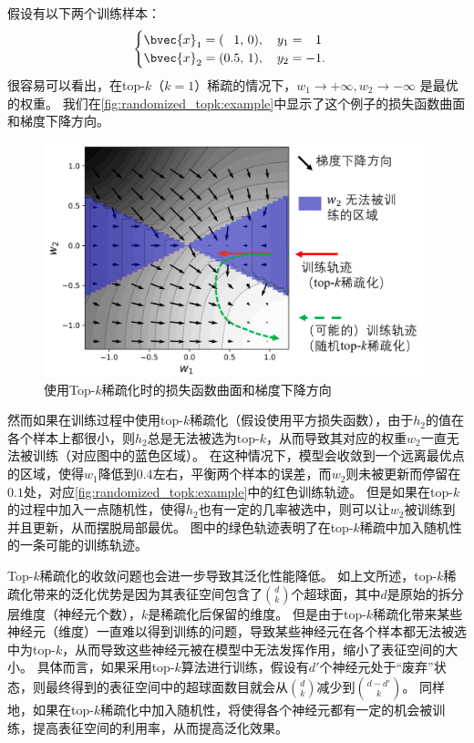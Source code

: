 假设有以下两个训练样本：
\begin{equation}
\begin{cases}
    \bvec{x}_1 = (\phantom{0.}1, \, 0), \quad y_1 = \phantom{-}1 \\
    \bvec{x}_2 = (          0.5, \, 1), \quad y_2 = -1.
\end{cases}
\end{equation}
%
很容易可以看出，在top-$k$（$k=1$）稀疏的情况下，$w_1 \to +\infty, w_2 \to -\infty$ 是最优的权重。
%
我们在\autoref{fig:randomized_topk:example}中显示了这个例子的损失函数曲面和梯度下降方向。


\begin{figure}[htbp]
    \centering
    \includegraphics[width=0.75\linewidth]{Z_Resources/随机topk_例子.png}
    \caption{使用Top-$k$稀疏化时的损失函数曲面和梯度下降方向}
    \label{fig:randomized_topk:example}
\end{figure}



然而如果在训练过程中使用top-$k$稀疏化（假设使用平方损失函数），由于$h_2$的值在各个样本上都很小，则$h_2$总是无法被选为top-$k$，从而导致其对应的权重$w_2$一直无法被训练（对应图中的蓝色区域）。
%
在这种情况下，模型会收敛到一个远离最优点的区域，使得$w_1$降低到$0.4$左右，平衡两个样本的误差，而$w_2$则未被更新而停留在$0.1$处，对应\autoref{fig:randomized_topk:example}中的红色训练轨迹。
%
但是如果在top-$k$的过程中加入一点随机性，使得$h_2$也有一定的几率被选中，则可以让$w_2$被训练到并且更新，从而摆脱局部最优。
图中的绿色轨迹表明了在top-$k$稀疏中加入随机性的一条可能的训练轨迹。


Top-$k$稀疏化的收敛问题也会进一步导致其泛化性能降低。
%
如上文所述，top-$k$稀疏化带来的泛化优势是因为其表征空间包含了$d \choose k$个超球面，其中$d$是原始的拆分层维度（神经元个数），$k$是稀疏化后保留的维度。
%
但是由于top-$k$稀疏化带来某些神经元（维度）一直难以得到训练的问题，导致某些神经元在各个样本都无法被选中为top-$k$，从而导致这些神经元被在模型中无法发挥作用，缩小了表征空间的大小。
%
具体而言，如果采用top-$k$算法进行训练，假设有$d'$个神经元处于“废弃”状态，则最终得到的表征空间中的超球面数目就会从$d \choose k$减少到$d - d' \choose k$。
%
同样地，如果在top-$k$稀疏化中加入随机性，将使得各个神经元都有一定的机会被训练，提高表征空间的利用率，从而提高泛化效果。


